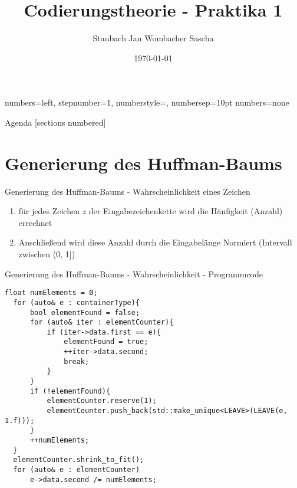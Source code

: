 \documentclass{beamer}
\title{Codierungstheorie - Praktika 1}
\date{\today}
\author{Staubach Jan \newline Wombacher Sascha \newline}
\begin{document}
  {numbers=left, stepnumber=1, numberstyle=\tiny, numbersep=10pt}
  {numbers=none}


  \maketitle
  \begin{frame}{Agenda}
    [sections numbered]
    \tableofcontents[hideallsubsections]
  \end{frame}

  \section{Generierung des Huffman-Baums}
  \begin{frame}{Generierung des Huffman-Baums - \newline Wahrscheinlichkeit eines Zeichen}
  	\begin{enumerate}
	  	\item für jedes Zeichen $z$ der Eingabezeichenkette wird die Häufigkeit (Anzahl) errechnet
	  	\item Anschließend wird diese Anzahl durch die Eingabelänge Normiert (Intervall zwischen (0, 1])
	\end{enumerate}
  \end{frame}
  
    \begin{frame}[fragile]{Generierung des Huffman-Baums - \newline Wahrscheinlichkeit - Programmcode}
    	\begin{lstlisting}[style=numbers]
  float numElements = 0;
  for (auto& e : containerType){
      bool elementFound = false;
      for (auto& iter : elementCounter){
          if (iter->data.first == e){
              elementFound = true;
              ++iter->data.second;
              break;
          }
      }
      if (!elementFound){
          elementCounter.reserve(1);
          elementCounter.push_back(std::make_unique<LEAVE>(LEAVE(e, 1.f)));
      }
      ++numElements;
  }
  elementCounter.shrink_to_fit();
  for (auto& e : elementCounter)
      e->data.second /= numElements;
\end{lstlisting}
\end{frame}
    
\end{document}
